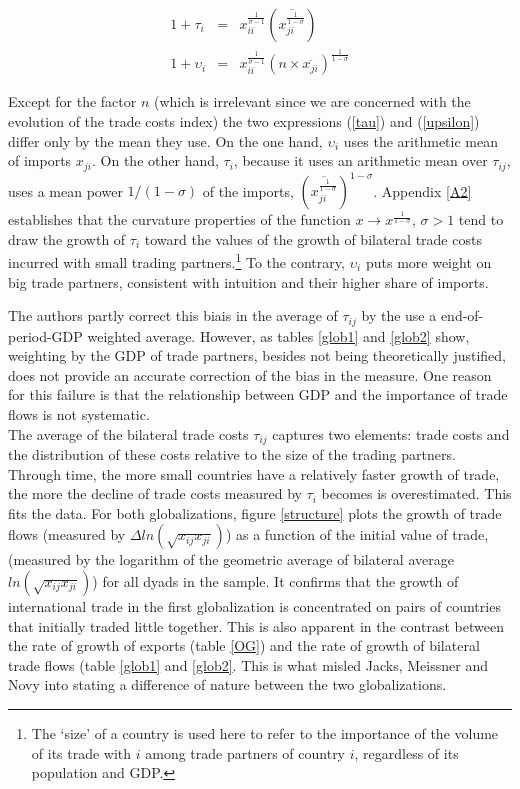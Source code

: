 \documentclass{article}
\begin{document}
\begin{eqnarray}
1+\tau_i&=& x_{ii}^{\frac{1}{\sigma-1}} \left(\overline{{x_{ji}^{\frac{1}{1-\sigma}}}}\right) \label{tau}\\
1+\upsilon_i&=&x_{ii}^{\frac{1}{\sigma-1}} (n \times \overline{x_{ji}})^{\frac{1}{1-\sigma}}\label{upsilon}
\end{eqnarray}

Except for the factor $n$ (which is irrelevant since we are
concerned with the evolution of the trade costs index) the two
expressions (\ref{tau}) and (\ref{upsilon}) differ only by the
mean they use. On the one hand, $\upsilon_i$ uses the
arithmetic mean of imports $x_{ji}$. On the other hand,
$\tau_i$, because it uses an arithmetic mean over $\tau_{ij}$,
uses a mean power $1/(1-\sigma)$ of the imports,
$\left(\overline{x_{ji}^{\frac{1}{1-\sigma}}}\right)^{1-\sigma}$.
Appendix \ref{A2} establishes that the curvature
properties of the function $x \rightarrow
x^{\frac{1}{1-\sigma}}$, $\sigma>1$ tend to draw the growth of
$\tau_i$ toward the values of the growth of bilateral trade
costs incurred with small trading partners.\footnote{The `size' of a country is
used here to refer to the importance of the volume of its trade
with $i$ among trade partners of country $i$, regardless of its
population and GDP.} To the contrary,
$\upsilon_i$ puts more weight on big trade partners, consistent
with intuition and their higher share of imports.

The authors partly correct this biais in the average of $\tau_{ij}$ by the use a end-of-period-GDP
weighted average. However, as tables \ref{glob1} and \ref{glob2} show,
weighting by the GDP of trade partners, besides not being
theoretically justified, does not provide an accurate
correction of the bias in the measure. One reason for this
failure is that the relationship between GDP and the importance
of trade flows is not systematic.\\

The average of the bilateral trade costs $\tau_{ij}$ captures two elements: trade
costs and the distribution of these costs relative to the size
of the trading partners. Through time, the more small countries have a relatively faster growth of trade, the more the decline of trade costs measured by $\tau_i$ becomes is overestimated.
This fits the data. For both globalizations, figure
\ref{structure} plots the growth of trade flows (measured by
$\Delta ln (\sqrt{x_{ij} x_{ji}})$) as a function of the
initial value of trade, (measured by the logarithm of the
geometric average of bilateral average $ln(\sqrt{x_{ij}
x_{ji}})$) for all dyads in the sample. It confirms that the
growth of international trade in the first globalization is
concentrated on pairs of countries that initially traded little
together. This is also apparent in the contrast between the rate of growth of exports
(table \ref{OG}) and the rate of growth of bilateral trade flows (table \ref{glob1} and \ref{glob2}.
This is what misled Jacks, Meissner and Novy into
stating a difference of nature between the two globalizations.
\end{document}
